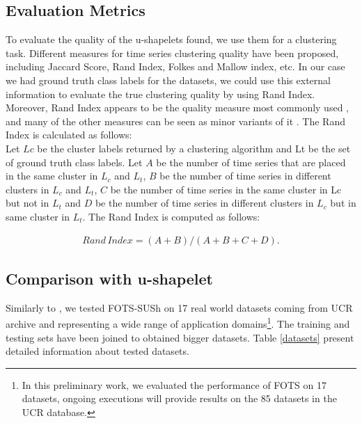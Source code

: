\subsection{Evaluation Metrics}
To evaluate the quality of the u-shapelets found, we use them for a clustering task. Different measures for time series clustering quality have been proposed, including Jaccard Score, Rand Index, Folkes and Mallow index, etc. In our case we had ground truth class labels for the datasets, we could use this external information to evaluate the true clustering quality by using Rand Index. Moreover, Rand Index appears to be the quality measure  most commonly used   \cite{zakaria2012clustering} \cite{ulanova2015scalable} \cite{zhang2016unsupervised}, and many of the other measures can be seen as minor variants of it \cite{halkidi2001clustering}.
The Rand Index \cite{rand1971objective} is calculated as follows:
\\
Let $Lc$ be the cluster labels returned by a clustering algorithm and Lt be the
set of ground truth class labels. Let $A$ be the number of time series that are
placed in the same cluster in $L_c$ and $L_t$, $B$ be the number of time series in
different clusters in $L_c$ and $L_t$, $C$ be the number of time series in the same
cluster in Lc but not in $L_t$ and $D$ be the number of time series in different
clusters in $L_c$ but in same cluster in $L_t$. The Rand Index is computed as follows:  

\begin{eqnarray}
Rand\,Index = (A+B)/(A+B+C+D).
\end{eqnarray}    

\subsection{Comparison with u-shapelet}
Similarly to \cite{dallachiesa}, we tested FOTS-SUSh on 17 real world datasets coming from UCR archive \cite{UCRArchive} and representing a wide range of application domains\footnote{In this preliminary work, we evaluated the performance of FOTS on 17 datasets, ongoing executions will provide results on the 85 datasets in the UCR database.}. The training and testing sets have been joined to obtained bigger datasets. Table \ref{datasets} present detailed information about tested datasets.




